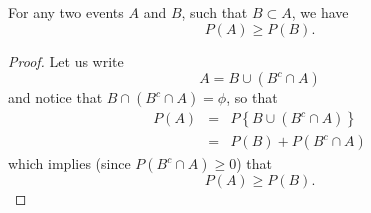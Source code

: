 \documentclass[notes=show,handout]{beamer}\usepackage[]{graphicx}\usepackage[]{color}
\newcommand{\bea}{\begin{eqnarray}}
\newcommand{\eea}{\end{eqnarray}}
\newcommand{\nn}{\nonumber}
\begin{document}
\begin{frame}{\secname}


\def\firstcircle{(3,1) circle (2.95cm)}
\def\secondcircle{(1:3cm) circle (1.65cm)}

\hspace{3cm} \vspace{2cm}
\end{frame}

%
%
%

\begin{frame}{\secname}
\begin{theorem}
For any two events $A$ and $B$, such that $B \subset A$, we have
$$
P(A) \geq P(B).
$$
\end{theorem} \vspace{0.1cm}
\begin{footnotesize}
\begin{proof}
Let us write
$$A = B \cup (B^c \cap A) $$
and notice that $B \cap (B^c \cap A) = \phi$, so that
\bea
P(A) &=& P\left\{ B \cup (B^c \cap A)   \right\} \nn \\
&=& P(B) + P(B^c \cap A) \nn
\eea
which implies (since $P(B^c \cap A) \geq 0$) that
$$
P(A) \geq   P(B).
$$

\end{proof}
\end{footnotesize}

\end{frame}
\end{document}
